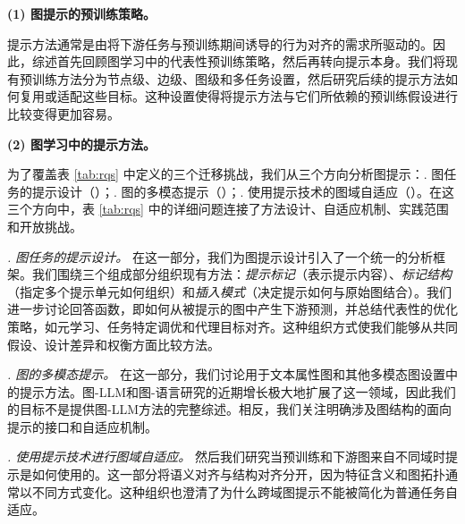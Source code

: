\textbf{(1) 图提示的预训练策略。}

提示方法通常是由将下游任务与预训练期间诱导的行为对齐的需求所驱动的。因此，综述首先回顾图学习中的代表性预训练策略，然后再转向提示本身。我们将现有预训练方法分为节点级、边级、图级和多任务设置，然后研究后续的提示方法如何复用或适配这些目标。这种设置使得将提示方法与它们所依赖的预训练假设进行比较变得更加容易。



\textbf{(2) 图学习中的提示方法。}

为了覆盖表 \ref{tab:rqs} 中定义的三个迁移挑战，我们从三个方向分析图提示：. 图任务的提示设计（）；. 图的多模态提示（）；. 使用提示技术的图域自适应（）。在这三个方向中，表 \ref{tab:rqs} 中的详细问题连接了方法设计、自适应机制、实践范围和开放挑战。

\textit{. 图任务的提示设计。} 在这一部分，我们为图提示设计引入了一个统一的分析框架。我们围绕三个组成部分组织现有方法：\textit{提示标记}（表示提示内容）、\textit{标记结构}（指定多个提示单元如何组织）和\textit{插入模式}（决定提示如何与原始图结合）。我们进一步讨论回答函数，即如何从被提示的图中产生下游预测，并总结代表性的优化策略，如元学习、任务特定调优和代理目标对齐。这种组织方式使我们能够从共同假设、设计差异和权衡方面比较方法。


\textit{. 图的多模态提示。} 在这一部分，我们讨论用于文本属性图和其他多模态图设置中的提示方法。图-LLM和图-语言研究的近期增长极大地扩展了这一领域，因此我们的目标不是提供图-LLM方法的完整综述。相反，我们关注明确涉及图结构的面向提示的接口和自适应机制。

\textit{. 使用提示技术进行图域自适应。} 然后我们研究当预训练和下游图来自不同域时提示是如何使用的。这一部分将语义对齐与结构对齐分开，因为特征含义和图拓扑通常以不同方式变化。这种组织也澄清了为什么跨域图提示不能被简化为普通任务自适应。


